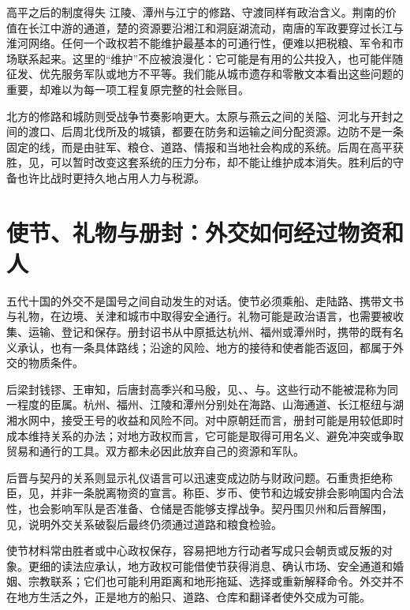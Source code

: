\begin{causalchain}{高平之后的制度得失}
江陵、潭州与江宁的修路、守渡同样有政治含义。荆南的价值在长江中游的通道，楚的资源要沿湘江和洞庭湖流动，南唐的军政要穿过长江与淮河网络。任何一个政权若不能维护最基本的可通行性，便难以把税粮、军令和市场联系起来。这里的“维护”不应被浪漫化：它可能是有用的公共投入，也可能伴随征发、优先服务军队或地方不平等。我们能从城市遗存和零散文本看出这些问题的重要，却难以为每一项工程复原完整的社会账目。

北方的修路和城防则受战争节奏影响更大。太原与燕云之间的关隘、河北与开封之间的渡口、后周北伐所及的城镇，都要在防务和运输之间分配资源。边防不是一条固定的线，而是由驻军、粮仓、道路、情报和当地社会构成的系统。后周在高平获胜，见，可以暂时改变这套系统的压力分布，却不能让维护成本消失。胜利后的守备也许比战时更持久地占用人力与税源。

\section{使节、礼物与册封：外交如何经过物资和人}

五代十国的外交不是国号之间自动发生的对话。使节必须乘船、走陆路、携带文书与礼物，在边境、关津和城市中取得安全通行。礼物可能是政治语言，也需要被收集、运输、登记和保存。册封诏书从中原抵达杭州、福州或潭州时，携带的既有名义承认，也有一条具体路线；沿途的风险、地方的接待和使者能否返回，都属于外交的物质条件。

后梁封钱镠、王审知，后唐封高季兴和马殷，见、、与。这些行动不能被混称为同一程度的臣属。杭州、福州、江陵和潭州分别处在海路、山海通道、长江枢纽与湖湘水网中，接受王号的收益和风险不同。对中原朝廷而言，册封可能是用较低即时成本维持关系的办法；对地方政权而言，它可能是取得可用名义、避免冲突或争取贸易和通行的工具。双方都未必因此放弃自己的资源和军队。

后晋与契丹的关系则显示礼仪语言可以迅速变成边防与财政问题。石重贵拒绝称臣，见，并非一条脱离物资的宣言。称臣、岁币、使节和边城安排会影响国内合法性，也会影响军队是否准备、仓储是否能够支撑战争。契丹围贝州和后晋解围，见，说明外交关系破裂后最终仍须通过道路和粮食检验。

使节材料常由胜者或中心政权保存，容易把地方行动者写成只会朝贡或反叛的对象。更细的读法应承认，地方政权可能借使节获得消息、确认市场、安全通道和婚姻、宗教联系；它们也可能利用距离和地形拖延、选择或重新解释命令。外交并不在地方生活之外，正是地方的船只、道路、仓库和翻译者使外交成为可能。


\end{causalchain}
